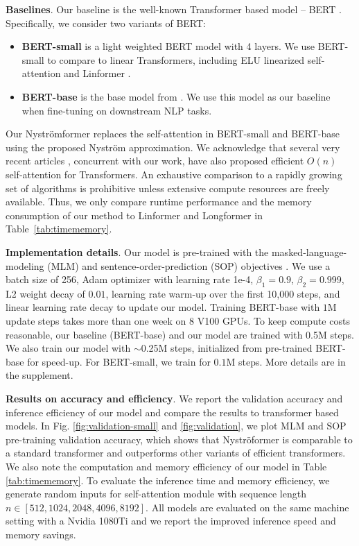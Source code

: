 \smallskip
 \textbf{Baselines}. 
Our baseline is the well-known Transformer based model -- BERT \cite{devlin2019bert}. Specifically, we consider two variants of BERT:

\begin{itemize}
    \item \textbf{BERT-small} is a light weighted BERT model with 4 layers. We use BERT-small to compare to linear Transformers, including ELU linearized self-attention \cite{katharopoulos-et-al-2020} and Linformer \cite{wang2020linformer}. 
    \item \textbf{BERT-base} is the base model from \cite{devlin2019bert}. We use this model as our baseline when fine-tuning on downstream NLP tasks. 
\end{itemize}

Our Nystr\"{o}mformer replaces the self-attention in BERT-small and BERT-base using the proposed Nystr\"{o}m approximation. We acknowledge that several very recent articles \cite{zaheer2020big,Beltagy2020Longformer}, concurrent with our work, have also proposed efficient $O(n)$ self-attention for Transformers. An exhaustive comparison to a rapidly growing set of algorithms is prohibitive unless extensive compute resources are freely available. Thus, we only compare runtime performance and the memory consumption of our method to Linformer \cite{wang2020linformer} and Longformer \cite{Beltagy2020Longformer} in Table~\ref{tab:timememory}. 

\smallskip
 \textbf{Implementation details}. Our model is pre-trained with the masked-language-modeling (MLM) and sentence-order-prediction (SOP) objectives \cite{lan2019albert}. We use a batch size of 256, Adam optimizer with learning rate 1e-4, $\beta_1 = 0.9$, $\beta_2 = 0.999$, L2 weight decay of $0.01$, learning rate warm-up over the first 10,000 steps, and linear learning rate decay to update our model. Training BERT-base with $1$M update steps takes more than one week on 8 V100 GPUs. To keep compute costs reasonable, our baseline (BERT-base) and our model are trained with 0.5M steps. We also train our model with $\sim$0.25M steps, initialized from pre-trained BERT-base for speed-up. For BERT-small, we train for $0.1$M steps. More details are in the supplement. 

\smallskip
 \textbf{Results on accuracy and efficiency}. We report the validation accuracy and inference efficiency of our model and compare the results to transformer based models. In Fig. \ref{fig:validation-small} and \ref{fig:validation}, we plot MLM and SOP pre-training validation accuracy, which shows that Nystr\"{o}former is comparable to a standard transformer and outperforms other variants of efficient transformers. We also note the computation and memory efficiency of our model in Table \ref{tab:timememory}. To evaluate the inference time and memory efficiency, we generate random inputs for self-attention module with sequence length $n \in [512, 1024, 2048, 4096, 8192]$. All models are evaluated on the same machine setting with a Nvidia 1080Ti and we report the improved inference speed and memory savings. 

